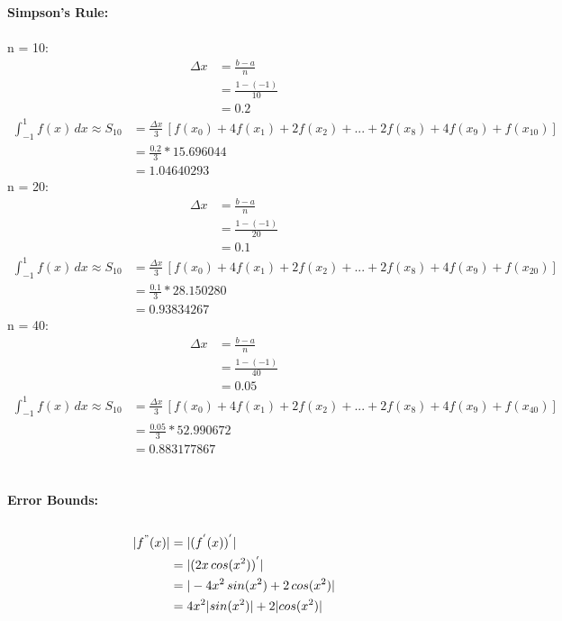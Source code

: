 \documentclass{article}
\begin{document}
    \textbf{Simpson's Rule:}\\\\
    n = 10:\\
    \begin{align*}
        \Delta x &= \frac{b-a}{n}\\
        &= \frac{1-(-1)}{10}\\
        &= 0.2
    \end{align*}
    \begin{align*}
        \int_{-1}^{1} f(x) \, dx \approx S_{10} &= \frac{\Delta x}{3} \, [f(x_0)+4f(x_1)+2f(x_2)+...+2f(x_8)+4f(x_9)+f(x_{10})] \\
        &= \frac{0.2}{3} * 15.696044 \\
        &= 1.04640293
    \end{align*}
    n = 20:\\
    \begin{align*}
        \Delta x &= \frac{b-a}{n}\\
        &= \frac{1-(-1)}{20}\\
        &= 0.1
    \end{align*}
    \begin{align*}
        \int_{-1}^{1} f(x) \, dx \approx S_{10} &= \frac{\Delta x}{3} \, [f(x_0)+4f(x_1)+2f(x_2)+...+2f(x_8)+4f(x_9)+f(x_{20})] \\
        &= \frac{0.1}{3} * 28.150280 \\
        &= 0.93834267
    \end{align*}
    n = 40:\\
    \begin{align*}
        \Delta x &= \frac{b-a}{n}\\
        &= \frac{1-(-1)}{40}\\
        &= 0.05
    \end{align*}
    \begin{align*}
        \int_{-1}^{1} f(x) \, dx \approx S_{10} &= \frac{\Delta x}{3} \, [f(x_0)+4f(x_1)+2f(x_2)+...+2f(x_8)+4f(x_9)+f(x_{40})] \\
        &= \frac{0.05}{3} * 52.990672\\
        &= 0.883177867
    \end{align*} \\\\
    
    \textbf{Error Bounds:} \\\\
    \begin{align*}
       |f^{"}(x)| &= |(f^{'}(x))^{'}| \\
        &= |(2x \, cos(x^2))^{'}| \\
        &= |-4x^2\,sin(x^2)+2\,cos(x^2)| \\
        &= 4x^2|sin(x^2)| + 2|cos(x^2)|
    \end{align*}
\end{document}
